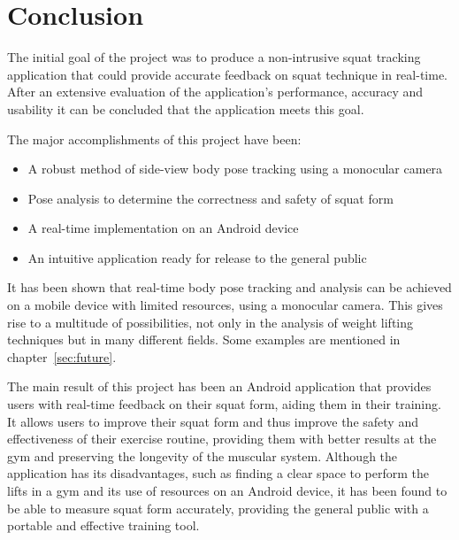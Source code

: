 \chapter{Conclusion}

The initial goal of the project was to produce a non-intrusive squat tracking application that could provide accurate feedback on squat technique in real-time. After an extensive evaluation of the application's performance, accuracy and usability it can be concluded that the application meets this goal.

The major accomplishments of this project have been:

\begin{itemize}
	\item A robust method of side-view body pose tracking using a monocular camera
	\item Pose analysis to determine the correctness and safety of squat form
	\item A real-time implementation on an Android device
	\item An intuitive application ready for release to the general public
\end{itemize}

It has been shown that real-time body pose tracking and analysis can be achieved on a mobile device with limited resources, using a monocular camera. This gives rise to a multitude of possibilities, not only in the analysis of weight lifting techniques but in many different fields. Some examples are mentioned in chapter~\ref{sec:future}.

The main result of this project has been an Android application that provides users with real-time feedback on their squat form, aiding them in their training. It allows users to improve their squat form and thus improve the safety and effectiveness of their exercise routine, providing them with better results at the gym and preserving the longevity of the muscular system. Although the application has its disadvantages, such as finding a clear space to perform the lifts in a gym and its use of resources on an Android device, it has been found to be able to measure squat form accurately, providing the general public with a portable and effective training tool.